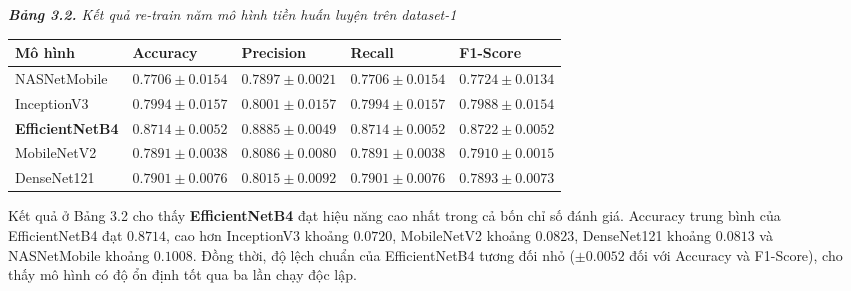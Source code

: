 \documentclass[
]{article}
\newcounter{none} %
\begin{document}
\emph{\textbf{Bảng 3.2.} Kết quả re-train năm mô hình tiền huấn luyện
trên dataset-1}

{\def\LTcaptype{none} %
\begin{longtable}[]{@{}
  >{\raggedright\arraybackslash}p{}
  >{\centering\arraybackslash}p{}
  >{\centering\arraybackslash}p{}
  >{\centering\arraybackslash}p{}
  >{\centering\arraybackslash}p{}@{}}
\toprule\noalign{}
\begin{minipage}[b]{\linewidth}\raggedright
\textbf{Mô hình}
\end{minipage} & \begin{minipage}[b]{\linewidth}\centering
\textbf{Accuracy}
\end{minipage} & \begin{minipage}[b]{\linewidth}\centering
\textbf{Precision}
\end{minipage} & \begin{minipage}[b]{\linewidth}\centering
\textbf{Recall}
\end{minipage} & \begin{minipage}[b]{\linewidth}\centering
\textbf{F1-Score}
\end{minipage} \\
\midrule\noalign{}
\endhead
\bottomrule\noalign{}
\endlastfoot
NASNetMobile & \(0.7706 \pm 0.0154\) & \(0.7897 \pm 0.0021\) &
\(0.7706 \pm 0.0154\) & \(0.7724 \pm 0.0134\) \\
InceptionV3 & \(0.7994 \pm 0.0157\) & \(0.8001 \pm 0.0157\) &
\(0.7994 \pm 0.0157\) & \(0.7988 \pm 0.0154\) \\
\textbf{EfficientNetB4} & \(\mathbf{0.8714} \pm \mathbf{0.0052}\) &
\(\mathbf{0.8885} \pm \mathbf{0.0049}\) &
\(\mathbf{0.8714} \pm \mathbf{0.0052}\) &
\(\mathbf{0.8722} \pm \mathbf{0.0052}\) \\
MobileNetV2 & \(0.7891 \pm 0.0038\) & \(0.8086 \pm 0.0080\) &
\(0.7891 \pm 0.0038\) & \(0.7910 \pm 0.0015\) \\
DenseNet121 & \(0.7901 \pm 0.0076\) & \(0.8015 \pm 0.0092\) &
\(0.7901 \pm 0.0076\) & \(0.7893 \pm 0.0073\) \\
\end{longtable}
}

Kết quả ở Bảng 3.2 cho thấy \textbf{EfficientNetB4} đạt hiệu năng cao
nhất trong cả bốn chỉ số đánh giá. Accuracy trung bình của EfficientNetB4
đạt \(0.8714\), cao hơn InceptionV3 khoảng \(0.0720\), MobileNetV2 khoảng
\(0.0823\), DenseNet121 khoảng \(0.0813\) và NASNetMobile khoảng
\(0.1008\). Đồng thời, độ lệch chuẩn của EfficientNetB4 tương đối nhỏ
(\(\pm 0.0052\) đối với Accuracy và F1-Score), cho thấy mô hình có độ ổn
định tốt qua ba lần chạy độc lập.
\end{document}
